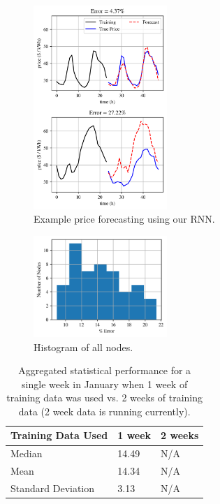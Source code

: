 \documentclass[sigconf]{acmart}
\begin{document}
\begin{figure}[h]
\includegraphics[width=0.45\textwidth]{fig_3.png}
\caption{Example price forecasting using our RNN.}
\label{fig:ex_forecast}
\end{figure}

\begin{figure}[h]
\includegraphics[width=0.45\textwidth]{fig_5.png}
\caption{Histogram of all nodes.}
\label{fig:hist_small}
\end{figure}



\begin{table}[h]
\begin{tabular}{lll}
\hline
Training Data Used & 1 week & 2 weeks \\
\hline
Median             & 14.49  & N/A     \\
Mean               & 14.34  & N/A     \\
Standard Deviation & 3.13   & N/A    \\
\hline
\end{tabular}
\caption{Aggregated statistical performance for a single week in January when 1 week of training data was used vs. 2 weeks of training data (2 week data is running currently).}
\label{tab:all_nodes}
\end{table}
\end{document}
